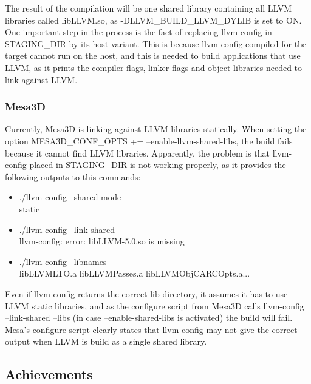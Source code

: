 \documentclass[12pt,a4paper,oneside]{article}
\begin{document}
The result of the compilation will be one shared library containing all LLVM
libraries called libLLVM.so, as {\selectfont
-DLLVM\_BUILD\_LLVM\_DYLIB} is set to ON.\\

One important step in the process is the fact of replacing llvm-config in STAGING\_DIR
by its host variant. This is because llvm-config compiled for the target cannot
run on the host, and this is needed to build applications that use LLVM, as it
prints the compiler flags, linker flags and object libraries needed to link
against LLVM.

\subsubsection*{Mesa3D}

Currently, Mesa3D is linking against LLVM libraries statically. When setting the
option {\selectfont MESA3D\_CONF\_OPTS += --enable-llvm-shared-libs},
the build fails because it cannot find LLVM libraries. Apparently, the problem is
that llvm-config placed in STAGING\_DIR is not working properly, as it provides
the following outputs to this commands:
\begin{itemize}
  \item {\selectfont./llvm-config --shared-mode\\
        static}
  \item {\selectfont./llvm-config --link-shared\\
        llvm-config: error: libLLVM-5.0.so is missing}

  \item {\selectfont./llvm-config --libnames\\
        libLLVMLTO.a libLLVMPasses.a libLLVMObjCARCOpts.a...}
\end{itemize}

Even if llvm-config returns the correct lib directory, it assumes it has to use
LLVM static libraries, and as the configure script from Mesa3D calls llvm-config
--link-shared --libs (in case --enable-shared-libs is activated) the build
will fail. Mesa's configure script clearly states that llvm-config may not give
the correct output when LLVM is build as a single shared library.


\subsection*{Achievements}
\end{document}
